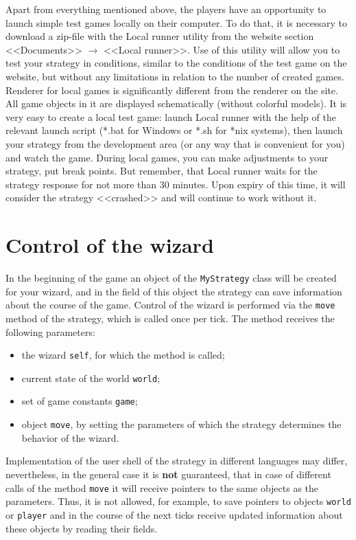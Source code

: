 Apart from everything mentioned above, the players have an opportunity to launch simple test games locally on their computer. To do that,
it is necessary to download a zip-file with the Local runner utility from the website section <<Documents>> $\rightarrow$ <<Local runner>>. Use of this
utility will allow you to test your strategy in conditions, similar to the conditions of the test game on the website, but without any limitations in relation to the
number of created games. Renderer for local games is significantly different from the renderer on the site. All game objects in it are displayed
schematically (without colorful models). It is very easy to create a local test game: launch Local runner with the help of
the relevant launch script (*.bat for Windows or *.sh for *nix systems), then launch your strategy from the development area (or any way
that is convenient for you) and watch the game. During local games, you can make adjustments to your strategy, put break points.
But remember, that Local runner waits for the strategy response for not more than $30$ minutes. Upon expiry of this time, it will consider
the strategy <<crashed>> and will continue to work without it.
 
\section{Control of the wizard}
 
In the beginning of the game an object of the \texttt{MyStrategy} class will be created for your wizard, and in the field of this object the strategy can save information
about the course of the game. Control of the wizard is performed via the \texttt{move} method of the strategy, which is called once per tick. The method
receives the following parameters:
\begin{itemize}
 \item the wizard \texttt{self}, for which the method is called;
 \item current state of the world \texttt{world};
 \item set of game constants \texttt{game};
 \item object \texttt{move}, by setting the parameters of which the strategy determines the behavior of the wizard.
\end{itemize}
 
Implementation of the user shell of the strategy in different languages may differ, nevertheless, in the general case it is \textbf{not} guaranteed, that in case of different calls
of the method \texttt{move} it will receive pointers to the same objects as the parameters. Thus, it is not allowed, for example,
to save pointers to objects \texttt{world} or \texttt{player} and in the course of the next ticks receive updated information about these objects by reading
their fields.
 

